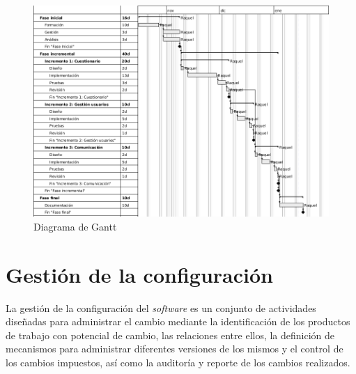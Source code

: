 \begin{landscape}

\begin{figure}[htbp] 
    \centering
    \includegraphics[height=\textwidth,keepaspectratio]{figuras/gantt_v2_en.png}
    \caption{Diagrama de Gantt}
    \label{fig:gantt}
\end{figure}	

\end{landscape}


\section{Gestión de la configuración}
La gestión de la configuración del \textit{software} es un conjunto de actividades diseñadas para administrar el cambio mediante la identificación de los productos de trabajo con potencial de cambio, las relaciones entre ellos, la definición de mecanismos para administrar diferentes versiones de los mismos y el control de los cambios impuestos, así como la auditoría y reporte de los cambios realizados\cite{pressman}.


